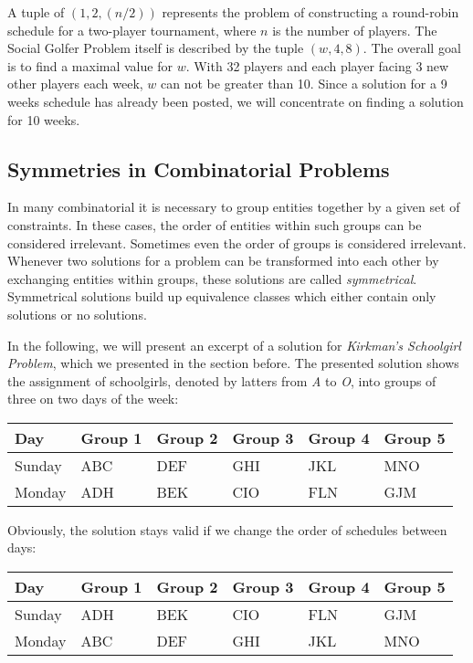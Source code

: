 \documentclass[a4paper]{scrartcl}
\begin{document}
A tuple of $(1,2,(n/2))$ represents the problem of constructing a round-robin schedule for a two-player tournament, where $n$ is the number of players. The Social Golfer Problem itself is described by the tuple $(w,4,8)$. The overall goal is to find a maximal value for $w$. With 32 players and each player facing 3 new other players each week, $w$ can not be greater than 10. Since a solution for a 9 weeks schedule has already been posted, we will concentrate on finding a solution for 10 weeks.

\subsection{Symmetries in Combinatorial Problems}

In many combinatorial it is necessary to group entities together by a given set of constraints. In these cases, the order of entities within such groups can be considered irrelevant. Sometimes even the order of groups is considered irrelevant. Whenever two solutions for a problem can be transformed into each other by exchanging entities within groups, these solutions are called \emph{symmetrical}. Symmetrical solutions build up equivalence classes which either contain only solutions or no solutions\cite{Smith01}.

In the following, we will present an excerpt of a solution for \emph{Kirkman's Schoolgirl Problem}, which we presented in the section before. The presented solution shows the assignment of schoolgirls, denoted by latters from \emph{A} to \emph{O}, into groups of three on two days of the week:

\begin{table}[h]
\centering
\begin{tabular}{ l | l  l  l l  l }
Day & Group 1 & Group 2 & Group 3 & Group 4 & Group 5 \\
\hline
Sunday & ABC & DEF & GHI & JKL & MNO \\
Monday & ADH  & BEK & CIO & FLN & GJM \\
\end{tabular}
\end{table}

Obviously, the solution stays valid if we change the order of schedules between days:

\begin{table}[h]
\centering
\begin{tabular}{ l | l  l  l l  l }
Day & Group 1 & Group 2 & Group 3 & Group 4 & Group 5 \\
\hline
Sunday & ADH  & BEK & CIO & FLN & GJM \\
Monday & ABC & DEF & GHI & JKL & MNO \\
\end{tabular}
\end{table}
\end{document}
